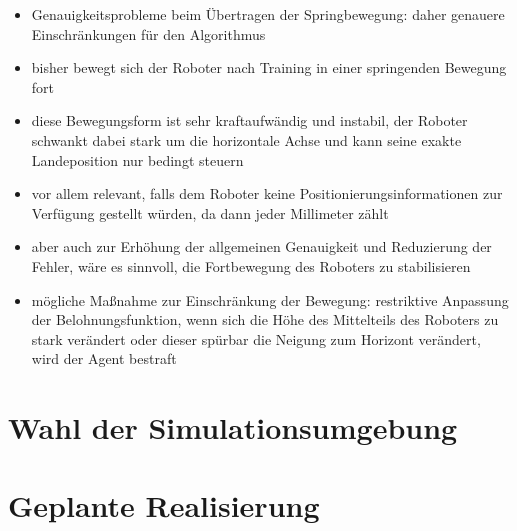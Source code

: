 \begin{itemize}
    \item Genauigkeitsprobleme beim Übertragen der Springbewegung: daher genauere Einschränkungen für den Algorithmus
    \item bisher bewegt sich der Roboter nach Training in einer springenden Bewegung fort
    \item diese Bewegungsform ist sehr kraftaufwändig und instabil, der Roboter schwankt dabei stark um die horizontale Achse und kann seine exakte Landeposition nur bedingt steuern
    \item vor allem relevant, falls dem Roboter keine Positionierungsinformationen zur Verfügung gestellt würden, da dann jeder Millimeter zählt
    \item aber auch zur Erhöhung der allgemeinen Genauigkeit und Reduzierung der Fehler, wäre es sinnvoll, die Fortbewegung des Roboters zu stabilisieren
    \item mögliche Maßnahme zur Einschränkung der Bewegung: restriktive Anpassung der Belohnungsfunktion, wenn sich die Höhe des Mittelteils des Roboters zu stark verändert oder dieser spürbar die Neigung zum Horizont verändert, wird der Agent bestraft
\end{itemize}

\section{Wahl der Simulationsumgebung}

\section{Geplante Realisierung}